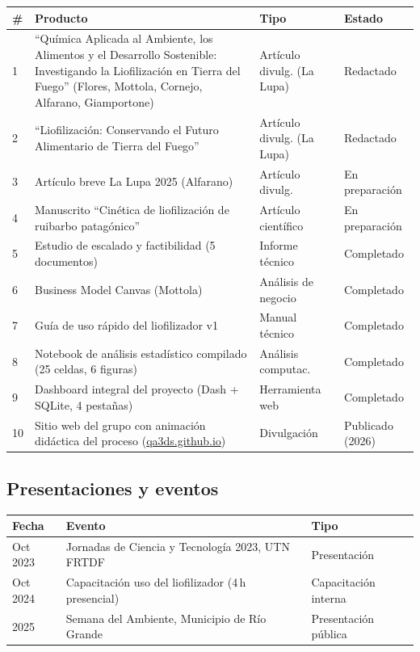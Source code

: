 \documentclass[12pt, a4paper]{article}
\begin{document}
\begin{longtable}{p{0.5cm}p{7.5cm}p{2.5cm}p{2.5cm}}
\toprule
\textbf{\#} & \textbf{Producto} & \textbf{Tipo} & \textbf{Estado} \\
\midrule
1 & ``Química Aplicada al Ambiente, los Alimentos y el Desarrollo Sostenible: Investigando la Liofilización en Tierra del Fuego'' (Flores, Mottola, Cornejo, Alfarano, Giamportone) & Artículo divulg. (La Lupa) & Redactado \\
2 & ``Liofilización: Conservando el Futuro Alimentario de Tierra del Fuego'' & Artículo divulg. (La Lupa) & Redactado \\
3 & Artículo breve La Lupa 2025 (Alfarano) & Artículo divulg. & En preparación \\
4 & Manuscrito ``Cinética de liofilización de ruibarbo patagónico'' & Artículo científico & En preparación \\
5 & Estudio de escalado y factibilidad (5 documentos) & Informe técnico & Completado \\
6 & Business Model Canvas (Mottola) & Análisis de negocio & Completado \\
7 & Guía de uso rápido del liofilizador v1 & Manual técnico & Completado \\
8 & Notebook de análisis estadístico compilado (25 celdas, 6 figuras) & Análisis computac. & Completado \\
9 & Dashboard integral del proyecto (Dash + SQLite, 4 pestañas) & Herramienta web & Completado \\
10 & Sitio web del grupo con animación didáctica del proceso (\href{https://qa3ds.github.io/}{qa3ds.github.io}) & Divulgación & Publicado (2026) \\
\bottomrule
\end{longtable}

\subsection{Presentaciones y eventos}

\begin{longtable}{p{3cm}p{7cm}p{3.5cm}}
\toprule
\textbf{Fecha} & \textbf{Evento} & \textbf{Tipo} \\
\midrule
Oct 2023 & Jornadas de Ciencia y Tecnología 2023, UTN FRTDF & Presentación \\
Oct 2024 & Capacitación uso del liofilizador (4\,h presencial) & Capacitación interna \\
2025 & Semana del Ambiente, Municipio de Río Grande & Presentación pública \\
\bottomrule
\end{longtable}
\end{document}
